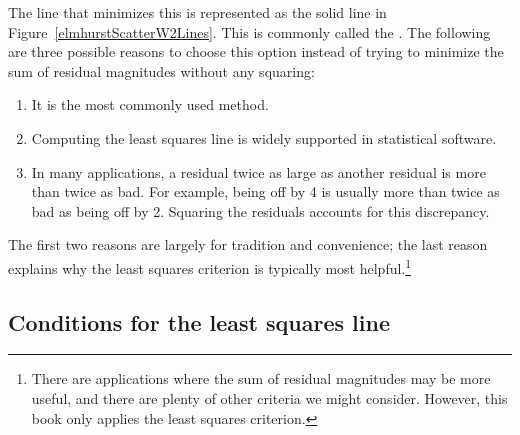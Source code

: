 The line that minimizes this 
is represented as the solid line in
Figure~\ref{elmhurstScatterW2Lines}.
This is commonly called the .
The following are three possible reasons to choose this option
instead of trying to minimize the sum of residual magnitudes
without any squaring:
\begin{enumerate}
\item
    It is the most commonly used method.
\item
    Computing the least squares line is widely supported
    in statistical software.
\item
    In many applications, a residual twice as large
    as another residual is more than twice as bad.
    For example, being off by 4 is usually more than twice
    as bad as being off by 2.
    Squaring the residuals accounts for this discrepancy.
\end{enumerate}
The first two reasons are largely for tradition and convenience;
the last reason explains why the least squares criterion
is typically most helpful.\footnote{There
  are applications where the sum of residual magnitudes
  may be more useful, and there are plenty of other criteria
  we might consider.
  However, this book only applies the least squares criterion.}


\subsection{Conditions for the least squares line}

